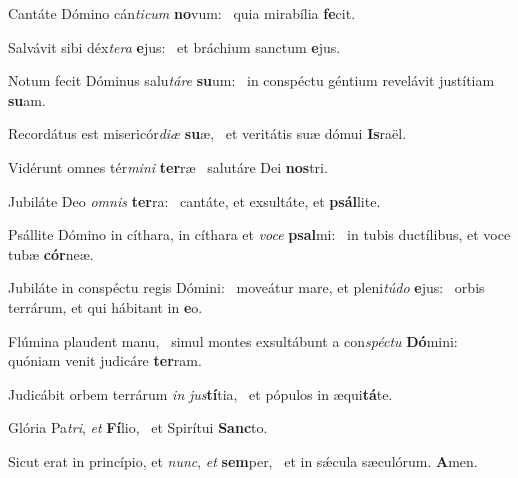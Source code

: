 \item Cantáte Dómino cán\textit{ticum} \textbf{no}vum:~\psstar{} quia mirabília \textbf{fe}cit.
\item Salvávit sibi déx\textit{tera} \textbf{e}jus:~\psstar{} et bráchium sanctum \textbf{e}jus.
\item Notum fecit Dóminus salu\textit{táre} \textbf{su}um:~\psstar{} in conspéctu géntium revelávit justítiam \textbf{su}am.
\item Recordátus est misericór\textit{diæ} \textbf{su}æ,~\psstar{} et veritátis suæ dómui \textbf{Is}raël.
\item Vidérunt omnes tér\textit{mini} \textbf{ter}ræ~\psstar{} salutáre Dei \textbf{nos}tri.
\item Jubiláte Deo \textit{omnis} \textbf{ter}ra:~\psstar{} cantáte, et exsultáte, et \textbf{psál}lite.
\item Psállite Dómino in cíthara, in cíthara et \textit{voce} \textbf{psal}mi:~\psstar{} in tubis ductílibus, et voce tubæ \textbf{cór}neæ.
\item Jubiláte in conspéctu regis Dómini:~\pscross{} moveátur mare, et pleni\textit{túdo} \textbf{e}jus:~\psstar{} orbis terrárum, et qui hábitant in \textbf{e}o.
\item Flúmina plaudent manu,~\pscross{} simul montes exsultábunt a con\textit{spéctu} \textbf{Dó}mini:~\psstar{} quóniam venit judicáre \textbf{ter}ram.
\item Judicábit orbem terrárum \textit{in} \textit{jus}\textbf{tí}tia,~\psstar{} et pópulos in æqui\textbf{tá}te.
\item Glória Pa\textit{tri}, \textit{et} \textbf{Fí}lio,~\psstar{} et Spirítui \textbf{Sanc}to.
\item Sicut erat in princípio, et \textit{nunc}, \textit{et} \textbf{sem}per,~\psstar{} et in sǽcula sæculórum. \textbf{A}men.